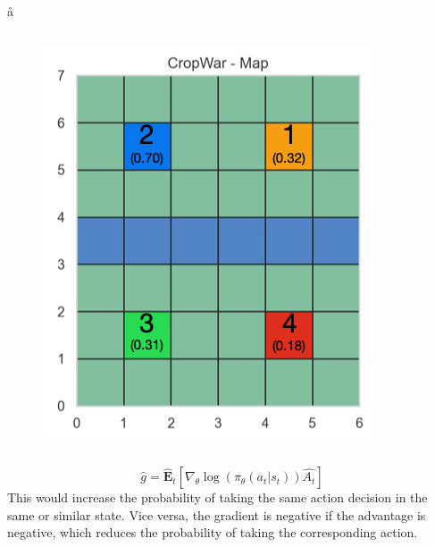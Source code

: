 \begin{frame}{\aa}{\aab}
    \begin{columns}
      \centering
      \begin{figure}
        \includegraphics[width=.8\textwidth]{Figures/v12_Map_start.png}
       \end{figure}
      \centering
    \end{columns}
  \end{frame}






  \begin{frame}{\ab}{\abb}
    \begin{equation}
      \hat{g} = \hat{\mathbf{E}}_t \left[ \nabla_{\theta} \log(\pi_{\theta}(a_t|s_t)) \hat{A_t} \right]
    \end{equation}
    This would increase the probability of taking the same action decision in the same or similar state. Vice versa, the gradient is negative if the advantage is negative, which reduces the probability of taking the corresponding action.
    \end{frame}



